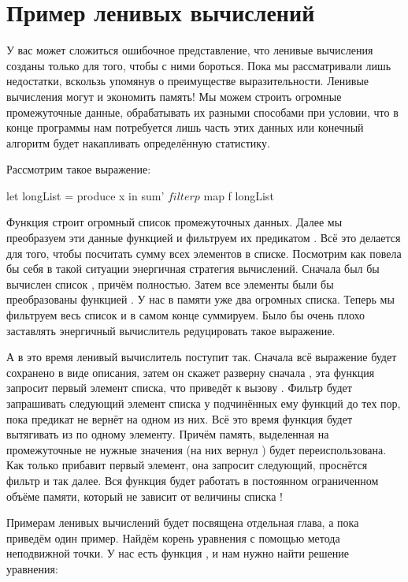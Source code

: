 \section{Пример ленивых вычислений}

У вас может сложиться ошибочное представление, что ленивые вычисления
созданы только для того, чтобы с ними бороться. Пока мы рассматривали
лишь недостатки, вскользь упомянув о преимуществе выразительности.
Ленивые вычисления могут и экономить память! Мы можем строить огромные
промежуточные данные, обрабатывать их разными способами при условии, что
в конце программы нам потребуется лишь часть этих данных или конечный
алгоритм будет накапливать определённую статистику.

Рассмотрим такое выражение:


\begin{code}
let longList = produce x
in  sum' $ filter p $ map f longList 
\end{code}

Функция  строит огромный список промежуточных данных. Далее
мы преобразуем эти данные функцией  и фильтруем их предикатом
. Всё это делается для того, чтобы посчитать сумму всех элементов
в списке. Посмотрим как повела бы себя в такой ситуации энергичная
стратегия вычислений. Сначала был бы вычислен список ,
причём полностью. Затем все элементы были бы преобразованы функцией
. У нас в памяти уже два огромных списка. Теперь мы фильтруем весь
список и в самом конце суммируем. Было бы очень плохо заставлять
энергичный вычислитель редуцировать такое выражение.

А в это время ленивый вычислитель поступит так. Сначала всё выражение
будет сохранено в виде описания, затем он скажет разверну сначала
, эта функция запросит первый элемент списка, что приведёт к
вызову . Фильтр будет запрашивать следующий элемент списка у
подчинённых ему функций до тех пор, пока предикат  не вернёт
 на одном из них. Всё это время функция  будет
вытягивать из  по одному элементу. Причём память, выделенная
на промежуточные не нужные значения (на них  вернул )
будет переиспользована. Как только  прибавит первый элемент,
она запросит следующий, проснётся фильтр и так далее. Вся функция будет
работать в постоянном ограниченном объёме памяти, который не зависит от
величины списка !

Примерам ленивых вычислений будет посвящена отдельная глава, а пока
приведём один пример. Найдём корень уравнения с помощью метода
неподвижной точки. У нас есть функция , и нам нужно
найти решение уравнения:


